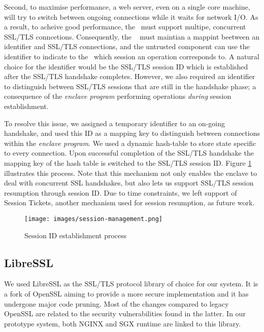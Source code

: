 \documentclass[../main.tex]{subfiles}
\begin{document}
Second, to maximise performance, a web server, even on a single core
machine, will try to switch between ongoing connections while it waits
for network I/O. As a result, to acheive good performance, the
\enclaveprogram~must support multipe, concurrent SSL/TLS conncetions.
Consequently, the \enclaveprogram~ must maintian a mappint beetween an
identifier and SSL/TLS connections, and the untrusted component can
use the identifier to indicate to the \enclaveprogram~which session an
operation corresponds to. A natural choice for the identifier would be
the SSL/TLS session ID which is established after the SSL/TLS
handshake completes. However, we also required an identifier to
distinguish between SSL/TLS sessions that are still in the handshake
phase; a consequence of the \textit{enclave program} performing
operations \textit{during} session establishment.

To resolve this issue, we assigned a temporary identifier to an
on-going handshake, and used this ID as a mapping key to distinguish
between connections within the \textit{enclave program}. We used a
dynamic hash-table to store state specific to every connection. Upon
successful completion of the SSL/TLS handshake the mapping key of the
hash table is switched to the SSL/TLS session ID. Figure
\ref{fig:session-management} illustrates this process. Note that this
mechanism not only enables the enclave to deal with concurrent SSL
handshakes, but also lets us support SSL/TLS session resumption
through session ID. Due to time constraints, we left support of
Session Tickets, another mechanism used for session resumption, as
future work.

\begin{figure}[H]
  \centering
  \texttt{[image: images/session-management.png]}
  \caption{Session ID establishment process}
  \label{fig:session-management}
\end{figure}

\subsection{LibreSSL}
\label{subsec:libressl}
We used LibreSSL as the SSL/TLS protocol library of choice for our
system. It is a fork of OpenSSL aiming to provide a more secure
implementation and it has undergone major code pruning. Most of the
changes compared to legacy OpenSSL are related to the security
vulnerabilities found in the latter. In our prototype system, both
NGINX and SGX runtime are linked to this library.
\end{document}
